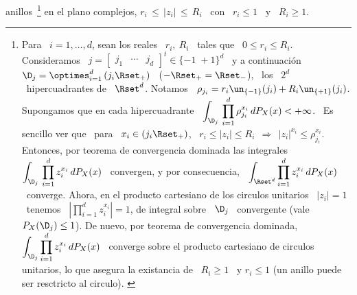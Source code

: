 anillos~\footnote{Para \ $i =  1, \ldots, d$, sean los reales \  $r_i, \: R_i$ \
  tales que  \ $0 \le r_i  \le R_i$. Consideramos  \ $j = \begin{bmatrix}  j_1 &
    \cdots & j_d  \end{bmatrix}^t \in \{ -1  \; +1 \}^d$ \ y  a continuaci\'on \
  $\D_j  =  \optimes_{i=1}^d  \left(  j_i  \Rset_+  \right)$  \  ($  -\Rset_+  =
  \Rset_-$),  \  los  \ $2^d$  \  hipercuadrantes  de  \ $\Rset^d$.   Notamos  \
  $\rho_{j_i} = r_i \un_{\{-1\}}(j_i)  + R_i \un_{\{+1\}}(j_i)$.  Supongamos que
  en   cada  hipercuadrante  \   $\displaystyle  \int_{\D_j}   \,  \prod_{i=1}^d
  \rho_{j_i}^{x_i} \,  dP_X(x) < +\infty$. \ Es  sencillo ver que \  para \ $x_i
  \in \left(  j_i \Rset_+ \right)$,  \ $r_i \le  |z_i| \le R_i  \:\: \Rightarrow
  \:\: |z_i|^{x_i} \le \rho_{j_i}^{x_i}$.  Entonces, por teorema de convergencia
  dominada  las   integrales  \  $\displaystyle   \int_{\D_j}  \,  \prod_{i=1}^d
  z_i^{x_i}  \,  dP_X(x)$ \  convergen,  y  por  consecuencia, \  $\displaystyle
  \int_{\Rset^d} \prod_{i=1}^d  z_i^{x_i} \, dP_X(x)$ \ converge.   Ahora, en el
  producto  cartesiano  de  los  circulos  unitarios \  $|z_i|=1$  \  tenemos  \
  $\displaystyle \left| \prod_{i=1}^d z_i^{x_i}  \right| = 1$, de integral sobre
  \ $\D_j$  \ convergente (vale  $P_X(\D_j) \le 1$).   De nuevo, por  teorema de
  convergencia dominada,  $\displaystyle \int_{\D_j} \prod_{i=1}^d  z_i^{x_i} \,
  dP_X(x)$ \ converge sobre el producto cartesiano de circulos unitarios, lo que
  asegura la existancia  de \ $R_i \ge 1$  \ y $r_i \le 1$ (un  anillo puede ser
  resctricto al circulo).
\label{Foot:MP:GeneradoraProbabilidadExistencia}}
 en  el plano complejos,
$r_i \, \le \, \left|  z_i \right| \, \le \, R_i$ \ con \ $r_i  \le 1$ \ y \ $R_i
\ge 1$.

